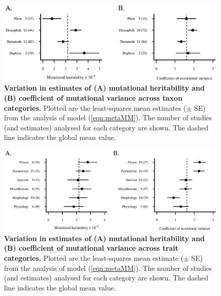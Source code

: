 \newpage
\FloatBarrier
\begin{figure}[!ht]
    \centering
    \includegraphics{Chp2_Meta/Fig4_Taxa_LSm.eps}
    \caption[Variation in estimates of (A) mutational heritability and (B) coefficient of mutational variance across taxon categories.]{\textbf{Variation in estimates of (A) mutational heritability and (B) coefficient of mutational variance across taxon categories.} Plotted are the least-squares mean estimates ($\pm$ SE) from the analysis of model (\ref{eqn:metaMM}). The number of studies (and estimates) analysed for each category are shown. The dashed line indicates the global mean value.}
    \label{fig:3TaxaLSM}
\end{figure}

\FloatBarrier
\vspace{5cm}
\begin{figure}[!h]
    \centering
    \includegraphics{Chp2_Meta/Fig3_SubTraits_LSm.eps}
    \caption[Variation in estimates of (A) mutational heritability and (B) coefficient of mutational variance across trait categories.]{\textbf{Variation in estimates of (A) mutational heritability and (B) coefficient of mutational variance across trait categories.} Plotted are the least-squares mean estimate ($\pm$ SE) from the analysis of model (\ref{eqn:metaMM}). The number of studies (and estimates) analysed for each category are shown. The dashed line indicates the global mean value.}
    \label{fig:4Subtraits}
\end{figure}

